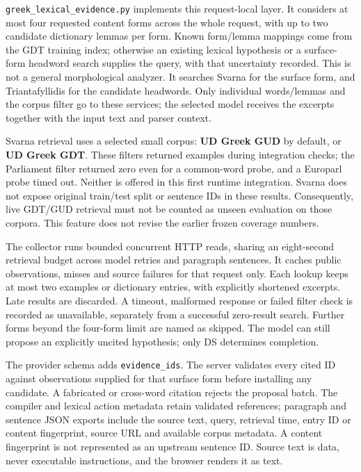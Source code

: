 \documentclass[11pt,a4paper]{article}
\begin{document}
\nolinkurl{greek_lexical_evidence.py} implements this request-local
layer. It considers at most four requested content forms across the
whole request, with up to two candidate dictionary lemmas per form.
Known form/lemma mappings come from the GDT training index; otherwise an
existing lexical hypothesis or a surface-form headword search supplies
the query, with that uncertainty recorded. This is not a general
morphological analyzer. It searches Svarna for the surface form, and
Triantafyllidis for the candidate headwords. Only individual
words/lemmas and the corpus filter go to these services; the selected
model receives the excerpts together with the input text and parser
context.

Svarna retrieval uses a selected small corpus: \textbf{UD Greek GUD} by
default, or \textbf{UD Greek GDT}. These filters returned examples
during integration checks; the Parliament filter returned zero even for
a common-word probe, and a Europarl probe timed out. Neither is offered
in this first runtime integration. Svarna does not expose original
train/test split or sentence IDs in these results. Consequently, live
GDT/GUD retrieval must not be counted as unseen evaluation on those
corpora. This feature does not revise the earlier frozen coverage
numbers.

The collector runs bounded concurrent HTTP reads, sharing an
eight-second retrieval budget across model retries and paragraph
sentences. It caches public observations, misses and source failures for
that request only. Each lookup keeps at most two examples or dictionary
entries, with explicitly shortened excerpts. Late results are discarded.
A timeout, malformed response or failed filter check is recorded as
unavailable, separately from a successful zero-result search. Further
forms beyond the four-form limit are named as skipped. The model can
still propose an explicitly uncited hypothesis; only DS determines
completion.

The provider schema adds \texttt{evidence\_ids}. The server validates
every cited ID against observations supplied for that surface form
before installing any candidate. A fabricated or cross-word citation
rejects the proposal batch. The compiler and lexical action metadata
retain validated references; paragraph and sentence JSON exports include
the source text, query, retrieval time, entry ID or content fingerprint,
source URL and available corpus metadata. A content fingerprint is not
represented as an upstream sentence ID. Source text is data, never
executable instructions, and the browser renders it as text.
\end{document}
